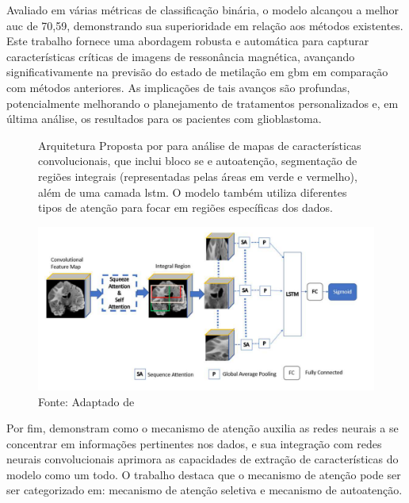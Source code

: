 Avaliado em várias métricas de classificação binária, o modelo alcançou a melhor \gls{auc} de 70,59, demonstrando sua superioridade em relação aos métodos existentes. Este trabalho fornece uma abordagem robusta e automática para capturar características críticas de imagens de ressonância magnética, avançando significativamente na previsão do estado de metilação em \gls{gbm} em comparação com métodos anteriores. As implicações de tais avanços são profundas, potencialmente melhorando o planejamento de tratamentos personalizados e, em última análise, os resultados para os pacientes com glioblastoma.

\begin{figure}[htbp]
    \centering
    \captionsetup{width=0.98\textwidth, justification=justified}
    \caption{Arquitetura Proposta por  para análise de mapas de características convolucionais, que inclui bloco \gls{se} e autoatenção, segmentação de regiões integrais (representadas pelas áreas em verde e vermelho), além de uma camada \gls{lstm}. O modelo também utiliza diferentes tipos de atenção para focar em regiões específicas dos dados.
    }
    \includegraphics[width=1\textwidth]{figures/fig010.png}
    \caption*{Fonte: Adaptado de \cite{iranmehrImprovedPredictionMGMT2022}}
    \label{fig:fig010}
\end{figure}


Por fim,  demonstram como o mecanismo de atenção auxilia as redes neurais a se concentrar em informações pertinentes nos dados, e sua integração com redes neurais convolucionais aprimora as capacidades de extração de características do modelo como um todo. O trabalho destaca que o mecanismo de atenção pode ser ser categorizado em: mecanismo de atenção seletiva e mecanismo de autoatenção.

